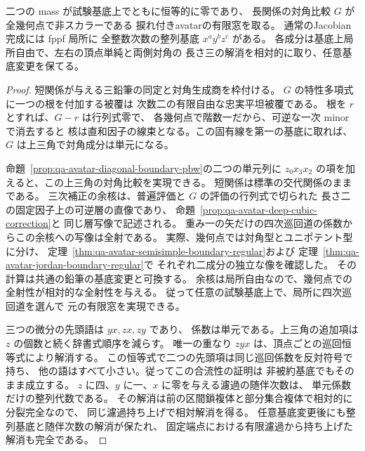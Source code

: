 \begin{theorem}[両mass零の非スカラー開の相対十二矢型]
\label{thm:qa-avatar-relative-nonscalar-pbw}
二つの mass が試験基底上でともに恒等的に零であり、
長関係の対角比較 $G$ が全幾何点で非スカラーである
捩れ付きavatarの有限窓を取る。
通常のJacobian完成には fppf 局所に
全整数次数の整列基底 $x^a y^b z^c$ がある。
各成分は基底上局所自由で、左右の頂点単純と両側対角の
長さ三の解消を相対的に取り、任意基底変更を保てる。
\end{theorem}
\begin{proof}
短関係が与える三鉛筆の同定と対角生成商を枠付ける。
$G$ の特性多項式に一つの根を付加する被覆は
次数二の有限自由な忠実平坦被覆である。
根を $r$ とすれば、$G-r$ は行列式零で、
各幾何点で階数一だから、可逆な一次 minor で消去すると
核は直和因子の線束となる。この固有線を第一の基底に取れば、
$G$ は上三角で対角成分は単元になる。

命題~\ref{prop:qa-avatar-diagonal-boundary-pbw}の二つの単元列に
$z_0x_3x_2$ の項を加えると、この上三角の対角比較を実現できる。
短関係は標準の交代関係のままである。
三次補正の余核は、普遍評価と $G$ の評価の行列式で切られた
長さ二の固定因子上の可逆層の直像であり、
命題~\ref{prop:qa-avatar-deep-cubic-correction}と
同じ層写像で記述される。
重み一の矢だけの四次巡回道の係数からこの余核への写像は全射である。
実際、幾何点では対角型とユニポテント型に分け、
定理~\ref{thm:qa-avatar-semisimple-boundary-regular}および
定理~\ref{thm:qa-avatar-jordan-boundary-regular}で
それぞれ二成分の独立な像を確認した。
その計算は共通の鉛筆の基底変更と可換する。
余核は局所自由なので、幾何点での全射性が相対的な全射性を与える。
従って任意の試験基底上で、局所に四次巡回道を選んで
元の有限窓を実現できる。

三つの微分の先頭語は $yx,zx,zy$ であり、
係数は単元である。上三角の追加項は
$z$ の個数と続く辞書式順序を減らす。
唯一の重なり $zyx$ は、頂点ごとの巡回恒等式により解消する。
この恒等式で二つの先頭項は同じ巡回係数を反対符号で持ち、
他の語はすべて小さい。従ってこの合流性の証明は
非被約基底でもそのまま成立する。
$z$ に四、$y$ に一、$x$ に零を与える濾過の随伴次数は、
単元係数だけの整列代数である。
その解消は前の区間鎖複体と部分集合複体で相対的に分裂完全なので、
同じ濾過持ち上げで相対解消を得る。
任意基底変更後にも整列基底と随伴次数の解消が保たれ、
固定端点における有限濾過から持ち上げた解消も完全である。
\end{proof}

